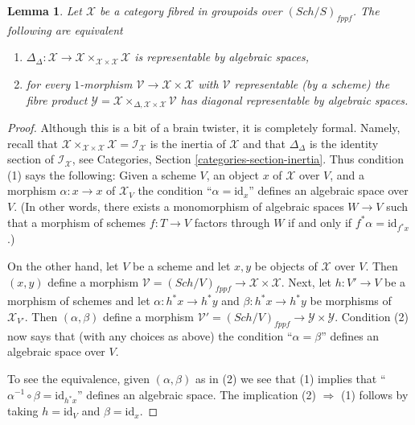 \documentclass{stacks-project}
\theoremstyle{plain}
\newtheorem{lemma}[subsection]{Lemma}
\theoremstyle{definition}
\theoremstyle{remark}
\numberwithin{equation}{subsection}
\def\Sch{\mathit{Sch}}
\begin{document}
\begin{lemma}
\label{lemma-second-diagonal}
Let $\mathcal{X}$ be a category fibred in groupoids over $(\Sch/S)_{fppf}$.
The following are equivalent
\begin{enumerate}
\item $\Delta_\Delta : \mathcal{X} \to
\mathcal{X} \times_{\mathcal{X} \times \mathcal{X}} \mathcal{X}$
is representable by algebraic spaces,
\item for every $1$-morphism $\mathcal{V} \to \mathcal{X} \times \mathcal{X}$
with $\mathcal{V}$ representable (by a scheme) the fibre product
$\mathcal{Y} =
\mathcal{X} \times_{\Delta, \mathcal{X} \times \mathcal{X}} \mathcal{V}$
has diagonal representable by algebraic spaces.
\end{enumerate}
\end{lemma}

\begin{proof}
Although this is a bit of a brain twister, it is completely formal.
Namely, recall that
$\mathcal{X} \times_{\mathcal{X} \times \mathcal{X}} \mathcal{X} =
\mathcal{I}_\mathcal{X}$ is the inertia of $\mathcal{X}$ and that
$\Delta_\Delta$ is the identity section of $\mathcal{I}_\mathcal{X}$, see
Categories, Section \ref{categories-section-inertia}.
Thus condition (1) says the following: Given a scheme $V$, an object $x$ of
$\mathcal{X}$ over $V$, and a morphism $\alpha : x \to x$ of $\mathcal{X}_V$
the condition ``$\alpha = \text{id}_x$'' defines an algebraic space over $V$.
(In other words, there exists a monomorphism of algebraic spaces $W \to V$
such that a morphism of schemes $f : T \to V$ factors through $W$
if and only if $f^*\alpha = \text{id}_{f^*x}$.)

\medskip\noindent
On the other hand, let $V$ be a scheme and let $x, y$ be objects of
$\mathcal{X}$ over $V$. Then $(x, y)$ define a morphism
$\mathcal{V} = (\Sch/V)_{fppf} \to \mathcal{X} \times \mathcal{X}$.
Next, let $h : V' \to V$ be a morphism of schemes and let
$\alpha : h^*x \to h^*y$ and $\beta : h^*x \to h^*y$ be morphisms
of $\mathcal{X}_{V'}$. Then $(\alpha, \beta)$ define a morphism
$\mathcal{V}' = (\Sch/V)_{fppf} \to \mathcal{Y} \times \mathcal{Y}$.
Condition (2) now says that (with any choices as above) the
condition ``$\alpha = \beta$'' defines an algebraic space over $V$.

\medskip\noindent
To see the equivalence, given $(\alpha, \beta)$ as in (2) we see that
(1) implies that ``$\alpha^{-1} \circ \beta = \text{id}_{h^*x}$''
defines an algebraic space. The implication (2) $\Rightarrow$ (1)
follows by taking $h = \text{id}_V$ and $\beta = \text{id}_x$.
\end{proof}
\end{document}
